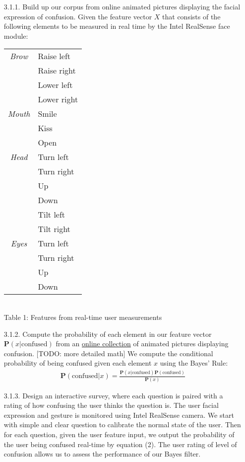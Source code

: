 \documentclass[12pt,letterpaper]{article}
\begin{document}
\begin{itemize}
\item[3.1.1.] Build up our corpus from online animated pictures displaying the facial expression of confusion. Given the feature vector $X$ that consists of the following elements to be measured in real time by the Intel RealSense face module:

\begin{center}
\begin{tabular}{ c | l}
\emph{Brow} &	Raise left \\
	&Raise right\\ 
	&Lower left\\
	&Lower right\\\hline
\emph{Mouth}&	Smile\\
	&Kiss\\
	&Open\\\hline
\emph{Head}	&Turn left\\
	&Turn right\\
	&Up\\
	&Down\\
	&Tilt left\\
	&Tilt right\\\hline
\emph{Eyes}	&Turn left\\
	&Turn right\\
	&Up\\
	&Down\\
\end{tabular}
\\\vspace{7 mm} Table 1: Features from real-time user measurements
\end{center}

\item[3.1.2.]  Compute the probability of each element in our feature vector $\mathbf{P}(x|\text{confused})$ from an 
\href{https://www.google.com/search?q=confused+gif&espv=2&biw=1121&bih=674&source=lnms&tbm=isch&sa=X&ei=NFn3VICgFYrEggSVxoKAAw&ved=0CAYQ_AUoAQ#tbm=isch&q=confusion+gif&revid=762198808}{online collection} of animated pictures displaying confusion. [TODO: more detailed math] We compute the conditional probability of being confused given each element $x$ using the Bayes' Rule:
\begin{align}
\mathbf{P}(\text{confused}|x) = \frac{\mathbf{P}(x|\text{confused})\mathbf{P}(\text{confused})}{\mathbf{P}(x)}
\end{align}

\item[3.1.3.]  Design an interactive survey, where each question is paired with a rating of how confusing the user thinks the question is. The user facial expression and gesture is monitored using Intel RealSense camera. We start with simple and clear question to calibrate the normal state of the user. Then for each question, given the user feature input, we output the probability of the user being confused real-time by equation (2). The user rating of level of confusion allows us to assess the performance of our Bayes filter. 


\end{itemize}
\end{document}
